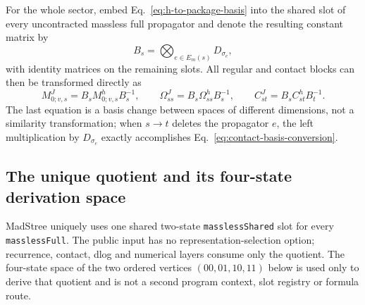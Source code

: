 \documentclass[11pt,a4paper]{article}
\begin{document}
For the whole sector, embed Eq.~\eqref{eq:h-to-package-basis} into the shared slot of every uncontracted massless full propagator and denote the resulting constant matrix by
\begin{equation}
 B_s=\bigotimes_{e\in E_m(s)}D_{\sigma_e},
 \label{eq:global-package-basis}
\end{equation}
with identity matrices on the remaining slots. All regular and contact blocks can then be transformed directly as
\begin{equation}
 M_{0;v,s}^{J}=B_sM_{0;v,s}^{h}B_s^{-1},
 \qquad
 \Omega_{ss}^{J}=B_s\Omega_{ss}^{h}B_s^{-1},
 \qquad
 C_{st}^{J}=B_sC_{st}^{h}B_t^{-1}.
 \label{eq:global-package-similarity}
\end{equation}
The last equation is a basis change between spaces of different dimensions, not a similarity transformation; when $s\to t$ deletes the propagator $e$, the left multiplication by $D_{\sigma_e}$ exactly accomplishes Eq.~\eqref{eq:contact-basis-conversion}.

\subsection{The unique quotient and its four-state derivation space}

MadStree uniquely uses one shared two-state \texttt{masslessShared} slot for every
\texttt{masslessFull}. The public input has no representation-selection option; recurrence,
contact, dlog and numerical layers consume only the quotient. The four-state space of the two
ordered vertices $(00,01,10,11)$ below is used only to derive that quotient and is not a second program
context, slot registry or formula route.
\end{document}
